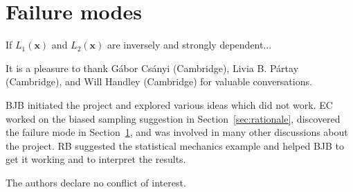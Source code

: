 \documentclass[journal,article,accept,moreauthors,pdftex,12pt,a4paper]{mdpi}
\newcommand{\xx}{\boldsymbol{x}}
\begin{document}
\section{Failure modes}\label{sec:failure_modes}

If $L_1(\xx)$ and $L_2(\xx)$ are inversely and strongly dependent...




It is a pleasure to thank Gábor Csányi (Cambridge), Livia B. Pártay (Cambridge),
and Will Handley (Cambridge)
for valuable conversations.



BJB initiated the project and explored various ideas which did not work.
EC worked on the biased sampling suggestion in Section~\ref{sec:rationale},
discovered the failure mode in Section~\ref{sec:failure_modes}, and was involved
in many other discussions about the project. RB suggested the statistical
mechanics example and helped BJB to get it working and to interpret the results.

The authors declare no conflict of interest.


\makeatletter
\renewcommand\@biblabel[1]{#1. }
\makeatother
\end{document}
